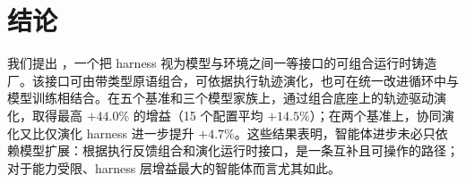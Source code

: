 \section{结论}
\label{sec:conclusion}

我们提出 \ProjectName，一个把 harness 视为模型与环境之间一等接口的可组合运行时铸造厂。该接口可由带类型原语组合，可依据执行轨迹演化，也可在统一改进循环中与模型训练相结合。在五个基准和三个模型家族上，\ProjectName 通过组合底座上的轨迹驱动演化，取得最高 $+44.0\%$ 的增益（15 个配置平均 $+14.5\%$）；在两个基准上，协同演化又比仅演化 harness 进一步提升 $+4.7\%$。这些结果表明，智能体进步未必只依赖模型扩展：根据执行反馈组合和演化运行时接口，是一条互补且可操作的路径；对于能力受限、harness 层增益最大的智能体而言尤其如此。
